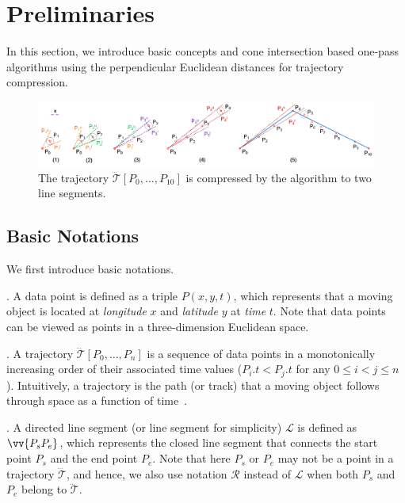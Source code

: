 \section{Preliminaries}
\label{sec-preliminary}
In this section, we introduce basic concepts and cone intersection based one-pass algorithms using the perpendicular Euclidean distances for trajectory compression.


\begin{figure}[tb!]
\centering
\includegraphics[scale=0.8]{figures/Fig-sleeve.png}
\vspace{-2.5ex}
\caption{\small The trajectory $\dddot{\mathcal{T}}[P_0, \ldots, P_{10}]$ is compressed by the \conei algorithm to two line segments.}
\vspace{-2ex}
\label{fig:sleeve}
\end{figure}



\subsection{Basic Notations}

We first introduce basic notations.

. A data point is defined as a triple $P(x, y, t)$, which represents that a moving object is located at {\em longitude} $x$ and {\em latitude} $y$ at {\em time} $t$. Note that data points can be viewed as points in a three-dimension Euclidean space.

. A trajectory $\dddot{\mathcal{T}}[P_0, \ldots, P_n]$ is a sequence of data points in a monotonically increasing order of their associated time values (\ie $P_i.t < P_j.t$ for any $0\le i<j\le n$). Intuitively, a trajectory is the path (or track) that a moving object follows through space as a function of time~\cite{physics-trajectory}.


. A directed line segment (or line segment for simplicity) $\mathcal{L}$ is defined as $\vv{P_{s}P_{e}}$, which represents the closed line segment that connects the start point $P_s$ and the end point $P_e$.
Note that here $P_s$ or $P_e$ may not be a point in a trajectory $\dddot{\mathcal{T}}$, and hence, we also use notation $\mathcal{R}$ instead of $\mathcal{L}$ when both $P_s$ and $P_e$ belong to $\dddot{\mathcal{T}}$.

